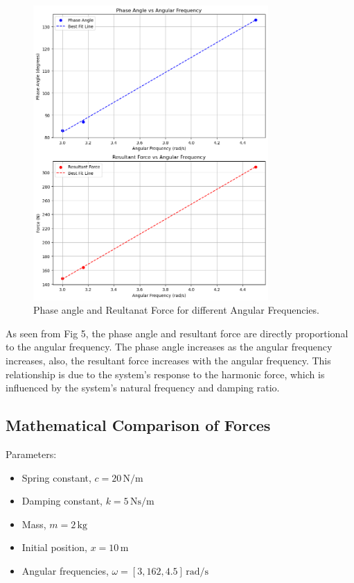 \documentclass[12pt,a4paper]{article}
\begin{document}
\begin{figure}[H]
    \centering
    \includegraphics[width=0.8\textwidth]{phase_force_angfreq.png} 
    \caption{Phase angle and Reultanat Force for different Angular Frequencies.}
    \label{fig:system}
\end{figure}

As seen from Fig 5, the phase angle and resultant force are directly proportional to the angular frequency. The phase angle increases as the angular frequency increases, also, the resultant force increases with the angular frequency. This relationship is due to the system's response to the harmonic force, which is influenced by the system's natural frequency and damping ratio.

\subsection{Mathematical Comparison of Forces}

Parameters:
\begin{itemize}
    \item Spring constant, \(c = 20 \, \text{N/m}\)
    \item Damping constant, \(k = 5 \, \text{Ns/m}\)
    \item Mass, \(m = 2 \, \text{kg}\)
    \item Initial position, \(x = 10 \, \text{m}\)
    \item Angular frequencies, \(\omega = [3, 162, 4.5] \, \text{rad/s}\)
\end{itemize}
\end{document}
